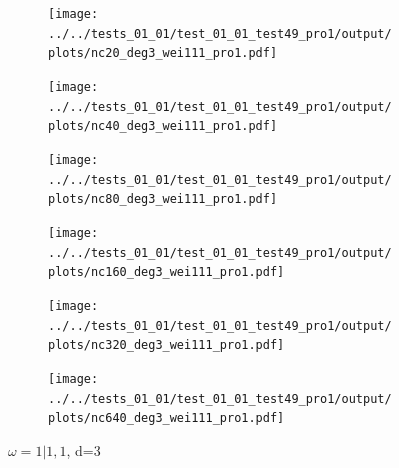 \documentclass[11pt,a4paper]{article}
\theoremstyle{plain}
\theoremstyle{definition}
\begin{document}
\begin{figure}[H]
\begin{subfigure}[b]{0.48\textwidth}
\texttt{[image: ../../tests\_01\_01/test\_01\_01\_test49\_pro1/output/plots/nc20\_deg3\_wei111\_pro1.pdf]}
\end{subfigure}\hspace*{\fill}
\begin{subfigure}[b]{0.48\textwidth}
\texttt{[image: ../../tests\_01\_01/test\_01\_01\_test49\_pro1/output/plots/nc40\_deg3\_wei111\_pro1.pdf]}
\end{subfigure}

\medskip
\begin{subfigure}[b]{0.48\textwidth}
\texttt{[image: ../../tests\_01\_01/test\_01\_01\_test49\_pro1/output/plots/nc80\_deg3\_wei111\_pro1.pdf]}
\end{subfigure}\hspace*{\fill}
\begin{subfigure}[b]{0.48\textwidth}
\texttt{[image: ../../tests\_01\_01/test\_01\_01\_test49\_pro1/output/plots/nc160\_deg3\_wei111\_pro1.pdf]}
\end{subfigure}

\medskip
\begin{subfigure}[b]{0.48\textwidth}
\texttt{[image: ../../tests\_01\_01/test\_01\_01\_test49\_pro1/output/plots/nc320\_deg3\_wei111\_pro1.pdf]}
\end{subfigure}\hspace*{\fill}
\begin{subfigure}[b]{0.48\textwidth}
\texttt{[image: ../../tests\_01\_01/test\_01\_01\_test49\_pro1/output/plots/nc640\_deg3\_wei111\_pro1.pdf]}
\end{subfigure}

\caption{$\omega=1|1,1$, d=3}
\end{figure}
\end{document}
